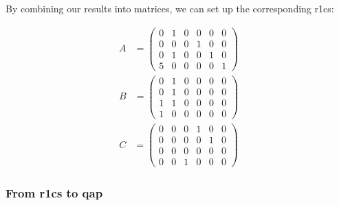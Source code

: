 By combining our results into matrices, we can set up the corresponding \acrshort{r1cs}:

\begin{align}
A&=\begin{pmatrix}
    0 & 1 & 0 & 0 & 0 & 0 \\
    0 & 0 & 0 & 1 & 0 & 0 \\
    0 & 1 & 0 & 0 & 1 & 0 \\
    5 & 0 & 0 & 0 & 0 & 1
\end{pmatrix}
\end{align}
\begin{align*}
B&=\begin{pmatrix}
    0 & 1 & 0 & 0 & 0 & 0 \\
    0 & 1 & 0 & 0 & 0 & 0 \\
    1 & 1 & 0 & 0 & 0 & 0 \\
    1 & 0 & 0 & 0 & 0 & 0
\end{pmatrix}
\end{align*}
\begin{align*}
C&=\begin{pmatrix}
    0 & 0 & 0 & 1 & 0 & 0 \\
    0 & 0 & 0 & 0 & 1 & 0 \\
    0 & 0 & 0 & 0 & 0 & 0 \\
    0 & 0 & 1 & 0 & 0 & 0
\end{pmatrix}
\end{align*}

\subsubsection{From \acrshort{r1cs} to \acrshort{qap}}

